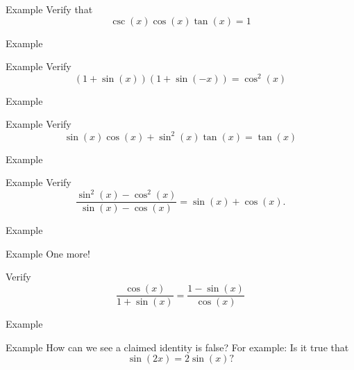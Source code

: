 \documentclass[presentation]{beamer}
\begin{document}
\begin{frame}[label={sec:org98ae5cc}]{Example}
Verify that
\[
\csc(x)\cos(x)\tan(x) = 1\]
\vspace{10in}
\end{frame}
\begin{frame}[label={sec:orgabd23a7}]{Example}
\end{frame}

\begin{frame}[label={sec:orga2a3f09}]{Example}
Verify
\[
\left( 1+\sin(x) \right) \left( 1 + \sin(-x) \right) = \cos^2(x)\]
\vspace{10in}
\end{frame}

\begin{frame}[label={sec:orgff46c67}]{Example}
\end{frame}

\begin{frame}[label={sec:org7c049db}]{Example}
Verify
\[
\sin(x) \cos(x) + \sin^2(x) \tan(x) = \tan(x)\]

\vspace{10in}
\end{frame}

\begin{frame}[label={sec:orgc30b74a}]{Example}
\end{frame}

\begin{frame}[label={sec:org005451a}]{Example}
Verify \[ \frac{\sin^2(x) - \cos^2(x)}{\sin(x) - \cos(x)} = \sin(x) +
\cos(x).\]

\vspace{10in}
\end{frame}

\begin{frame}[label={sec:org64303a6}]{Example}
\end{frame}

\begin{frame}[label={sec:org4b49f91}]{Example}
One more!

Verify
\[
\frac{\cos(x)}{1+\sin(x)} = \frac{1 - \sin(x)}{\cos(x)}\]

\vspace{10in}
\end{frame}

\begin{frame}[label={sec:org9b249b6}]{Example}
\end{frame}

\begin{frame}[label={sec:orgac792e1}]{Example}
How can we see a claimed identity is false?  For example: Is it true that
\[
\sin(2x) = 2\sin(x)?\]
\vspace{10in}
\end{frame}
\end{document}
